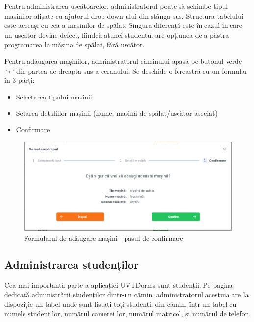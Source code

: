 \documentclass[12pt,a4paper]{report}
\theoremstyle{definition}
\theoremstyle{remark}
\begin{document}
\par Pentru administrarea uscătoarelor, administratorul poate să schimbe tipul \textnormal{ma\-și\-ni\-lor} afișate cu ajutorul drop-down-ului din stânga sus. Structura tabelului este aceeași cu cea a mașinilor de spălat. Singura diferență este în cazul în care un uscător devine defect, fiindcă atunci studentul are opțiunea de a păstra programarea la mășina de spălat, fără uscător.

\par Pentru adăugarea mașinilor, administratorul căminului apasă pe butonul verde \textit{`+'} din partea de dreapta sus a ecranului. Se deschide o fereastră cu un formular în 3 părți:

\begin{itemize}
    \item Selectarea tipului mașinii
    \item Setarea detaliilor mașinii (nume, mașină de spălat/uscător asociat)
    \item Confirmare
\end{itemize}

\begin{figure}[H]
    \centering
    \includegraphics[width=0.8\linewidth]{resurse/ghid_utilizare/adugare_masina.png}
    \caption{Formularul de adăugare mașini - pasul de confirmare}
\end{figure}

\subsection{Administrarea studenților}

\par Cea mai importantă parte a aplicației UVTDorms sunt studenții. Pe pagina dedicată administrării studenților dintr-un cămin, administratorul acestuia are la dispoziție un tabel unde sunt listați toți studenții din cămin, într-un tabel cu numele studenților, numărul camerei lor, numărul matricol, și numărul de telefon.
\end{document}
